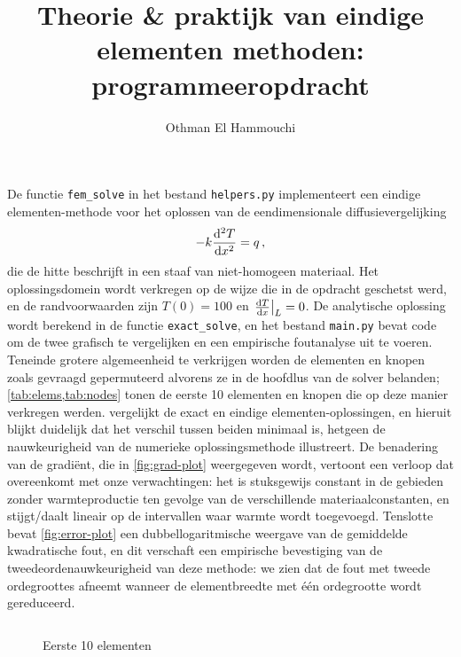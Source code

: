 \documentclass[titlepage]{article}
\title{Theorie \& praktijk van eindige elementen methoden: programmeeropdracht}
\author{Othman El Hammouchi}
\begin{document}
\begin{titlepage}
  \maketitle
\end{titlepage}

De functie \texttt{fem\_solve} in het bestand \texttt{helpers.py} implementeert een eindige elementen-methode
voor het oplossen van de eendimensionale diffusievergelijking
\begin{equation} \label{eq:heat}
  -k \odv[order=2]{T}{x} = q \,,
\end{equation}
die de hitte beschrijft in een staaf van niet-homogeen materiaal. Het oplossingsdomein wordt verkregen op de wijze die in de opdracht geschetst werd, en de randvoorwaarden zijn $T(0) = 100$ en $\odv{T}{x}_{L} = 0$. De analytische oplossing wordt berekend in de functie \texttt{exact\_solve}, en het bestand \texttt{main.py} bevat code om de twee grafisch te vergelijken en een empirische foutanalyse uit te voeren. Teneinde grotere algemeenheid te verkrijgen worden de elementen en knopen zoals gevraagd gepermuteerd alvorens ze in de hoofdlus van de solver belanden; \cref{tab:elems,tab:nodes} tonen de eerste 10 elementen en knopen die op deze manier verkregen werden.  vergelijkt de exact en eindige elementen-oplossingen, en hieruit blijkt duidelijk dat het verschil tussen beiden minimaal is, hetgeen de nauwkeurigheid van de numerieke oplossingsmethode illustreert. De benadering van de gradi\"ent, die in \cref{fig:grad-plot} weergegeven wordt, vertoont een verloop dat overeenkomt met onze verwachtingen: het is stuksgewijs constant in de gebieden zonder warmteproductie ten gevolge van de verschillende materiaalconstanten, en stijgt/daalt lineair op de intervallen waar warmte wordt toegevoegd. Tenslotte bevat \cref{fig:error-plot} een dubbellogaritmische weergave van de gemiddelde kwadratische fout, en dit verschaft een empirische bevestiging van de tweedeordenauwkeurigheid van deze methode: we zien dat de fout met tweede ordegroottes afneemt wanneer de elementbreedte met \'e\'en ordegrootte wordt gereduceerd.

\begin{figure}[!htb]
  \begin{displaymath}
        
  \end{displaymath}
  \caption{Eerste 10 elementen}
  \label{tab:elems}
\end{figure}
\end{document}
